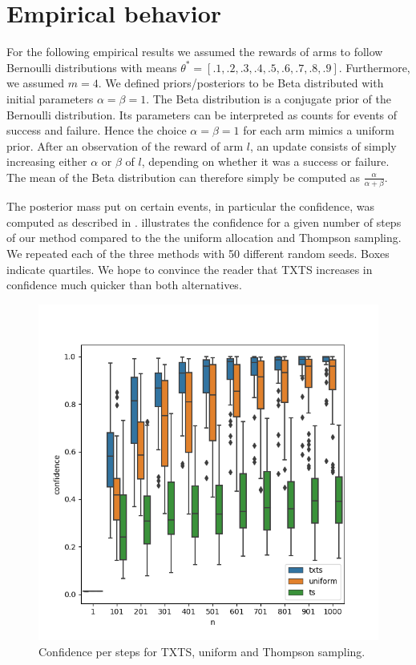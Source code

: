 \section{Empirical behavior}\label{section:empirical_behavior}

For the following empirical results we assumed the rewards of arms to follow
Bernoulli distributions with means $\theta^* = [.1, .2, .3, .4, .5, .6, .7, .8,
.9]$. Furthermore, we assumed $m=4$. We defined priors/posteriors to be Beta
distributed with initial parameters $\alpha = \beta = 1$. The Beta distribution
is a conjugate prior of the Bernoulli distribution. Its parameters can be
interpreted as counts for events of success and failure. Hence the choice
$\alpha = \beta = 1$ for each arm mimics a uniform prior. After an observation
of the reward of arm $l$, an update consists of simply increasing either
$\alpha$ or $\beta$ of $l$, depending on whether it was a success or failure.
The mean of the Beta distribution can therefore simply be computed as
$\frac{\alpha}{\alpha + \beta}$.

The posterior mass put on certain events, in particular the confidence, was
computed as described in . 
illustrates the confidence for a given number of steps of our method compared to
the the uniform allocation and Thompson sampling. We repeated each of the three
methods with 50 different random seeds. Boxes indicate quartiles. We
hope to convince the reader that TXTS increases in confidence much quicker than
both alternatives.
\begin{figure}[h]
  \centering
  \includegraphics[width=\textwidth]{190723-confidences.png}
  \caption{Confidence per steps for TXTS, uniform and Thompson sampling.}
  \label{fig:confidences}
\end{figure}

